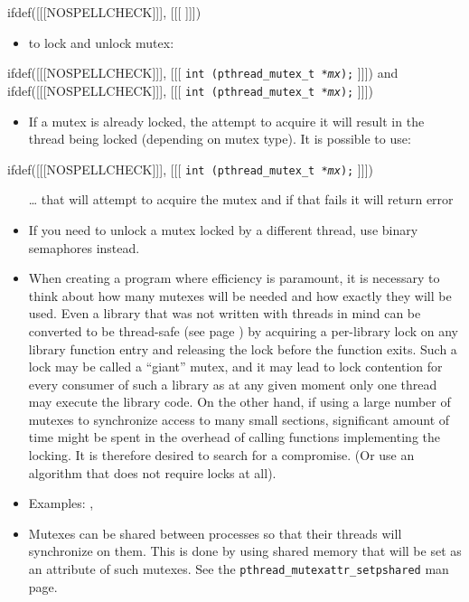 ifdef([[[NOSPELLCHECK]]], [[[
]]])

\begin{slide}

\begin{itemize}
\item to lock and unlock mutex:
\end{itemize}
ifdef([[[NOSPELLCHECK]]], [[[
\texttt{int (pthread\_mutex\_t *\emph{mx});}
]]])
and
ifdef([[[NOSPELLCHECK]]], [[[
\texttt{int (pthread\_mutex\_t *\emph{mx});}
]]])
\begin{itemize}
\item If a mutex is already locked, the attempt to acquire it will result
in the thread being locked (depending on mutex type).
It is possible to use:
\end{itemize}
ifdef([[[NOSPELLCHECK]]], [[[
\texttt{int (pthread\_mutex\_t *\emph{mx});}
]]])
\begin{itemize}
\item[\dots] that will attempt to acquire the mutex and if that fails it will
return error
\end{itemize}
\end{slide}

\label{MUTEXES2}

\begin{itemize}
\item If you need to unlock a mutex locked by a different thread, use binary
semaphores instead.
\item When creating a program where efficiency is paramount, it is necessary to
think about how many mutexes will be needed and how exactly they will be used.
Even a library that was not written with threads in mind can be converted to be
thread-safe (see page \pageref{THREADSAFE}) by acquiring a per-library lock on
any library function entry and releasing the lock before the function exits.
Such a lock may be called a ``giant'' mutex, and it may lead to lock contention
for every consumer of such a library as at any given moment only one thread may
execute the library code.  On the other hand, if using a large number of mutexes
to synchronize access to many small sections, significant amount of time might
be spent in the overhead of calling functions implementing the locking.  It is
therefore desired to search for a compromise.  (Or use an algorithm that does
not require locks at all).
\item \label{MUTEX_RACE} Examples: ,
\item Mutexes can be shared between processes so that their threads will
synchronize on them. This is done by using shared memory that will be set as an
attribute of such mutexes. See the
\texttt{pthread\_mutexattr\_setpshared} man page.
\end{itemize}



